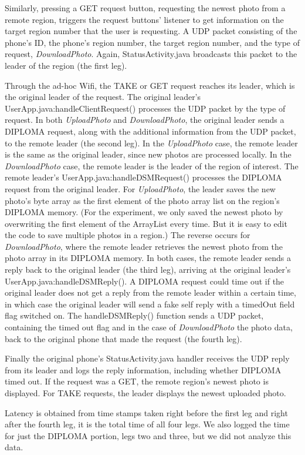 Similarly, pressing a GET request button, requesting the newest photo from a remote region, triggers the request buttons’ listener to get information on the target region number that the user is requesting. A UDP packet consisting of the phone’s ID, the phone’s region number, the target region number, and the type of request, {\it DownloadPhoto}. Again, StatusActivity.java broadcasts this packet to the leader of the region (the first leg).

Through the ad-hoc Wifi, the TAKE or GET request reaches its leader, which is the original leader of the request. The original leader’s UserApp.java:handleClientRequest() processes the UDP packet by the type of request. In both {\it UploadPhoto} and {\it DownloadPhoto}, the original leader sends a DIPLOMA request, along with the additional information from the UDP packet, to the remote leader (the second leg). In the {\it UploadPhoto} case, the remote leader is the same as the original leader, since new photos are processed locally. In the {\it DownloadPhoto} case, the remote leader is the leader of the region of interest. The remote leader's UserApp.java:handleDSMRequest() processes the DIPLOMA request from the original leader. For {\it UploadPhoto}, the leader saves the new photo's byte array as the first element of the photo array list on the region's DIPLOMA memory. (For the experiment, we only saved the newest photo by overwriting the first element of the ArrayList every time. But it is easy to edit the code to save multiple photos in a region.) The reverse occurs for {\it DownloadPhoto}, where the remote leader retrieves the newest photo from the photo array in its DIPLOMA memory.  In both cases, the remote leader sends a reply back to the original leader (the third leg), arriving at the original leader’s UserApp.java:handleDSMReply(). A DIPLOMA request could time out if the original leader does not get a reply from the remote leader within a certain time, in which case the original leader will send a fake self reply with a timedOut field flag switched on. The handleDSMReply() function sends a UDP packet, containing the timed out flag and in the case of {\it DownloadPhoto} the photo data, back to the original phone that made the request (the fourth leg).

Finally the original phone's StatusActivity.java handler receives the UDP reply from its leader and logs the reply information, including whether DIPLOMA timed out. If the request was a GET, the remote region’s newest photo is displayed. For TAKE requests, the leader displays the newest uploaded photo.

Latency is obtained from time stamps taken right before the first leg and right after the fourth leg, it is the total time of all four legs. We also logged the time for just the DIPLOMA portion, legs two and three, but we did not analyze this data.